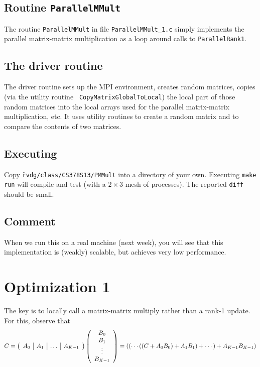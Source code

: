 \documentclass[10pt]{article}
\begin{document}
\subsection{Routine {\tt ParallelMMult}}

The routine {\tt ParallelMMult} in file {\tt ParallelMMult\_1.c} simply
implements the parallel matrix-matrix multiplication as a loop around
calls to {\tt ParallelRank1}.

\subsection{The driver routine}

The driver routine sets up the MPI environment, creates random
matrices, copies (via the utility routine {\tt
  CopyMatrixGlobalToLocal}) the local part of those random matrices into the
local arrays used for the parallel matrix-matrix multiplication, etc.
It uses utility routines to create a random matrix and to compare the
contents of two matrices.

\subsection{Executing}

Copy {\tt \~rvdg/class/CS378S13/PMMult} into a directory of your own.  
Executing {\tt make run} will compile and test (with a $ 2 \times 3 $
mesh of processes).  The reported {\tt diff} should be small.

\subsection{Comment}
When we run this on a real machine (next week), you will see that this
implementation is (weakly) scalable, but achieves very low
performance.

\section{Optimization 1}

The key is to locally call a matrix-matrix multiply rather than a
rank-1 update.  For this, observe that
\[
C = \left( 
\begin{array}{c | c | c | c}
A_0 & A_1 & \ldots & A_{K-1}
\end{array}
\right) 
\left(
\begin{array}{c}
B_0 \\
B_1 \\
\vdots \\
B_{K-1}
\end{array}
\right) 
=
(  (\cdots  ( ( C + A_0 B_0  ) + A_1 B_1 )  + \cdots ) + A_{K-1} B_{K-1} )
\]
\end{document}
